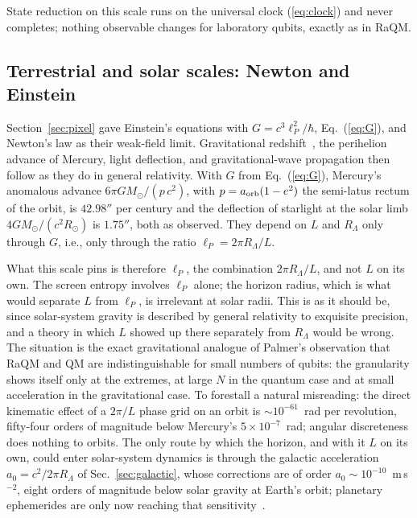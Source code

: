 \documentclass[aps,prd,twocolumn,superscriptaddress,nofootinbib,showkeys]{revtex4-2}
\begin{document}
State reduction on this scale runs on the universal clock (\ref{eq:clock}) and never completes; nothing observable changes for laboratory qubits, exactly as in RaQM.

\subsection{Terrestrial and solar scales: Newton and Einstein}

Section~\ref{sec:pixel} gave Einstein's equations with $G = c^3\ell_P^2/\hbar$, Eq.~(\ref{eq:G}), and Newton's law as their weak-field limit. Gravitational redshift~\cite{pound1960}, the perihelion advance of Mercury, light deflection, and gravitational-wave propagation then follow as they do in general relativity. With $G$ from Eq.~(\ref{eq:G}), Mercury's anomalous advance $6\pi GM_\odot/(p\,c^2)$, with $p = a_{\rm orb}(1-e^2)$ the semi-latus rectum of the orbit, is $42.98''$ per century and the deflection of starlight at the solar limb $4GM_\odot/(c^2R_\odot)$ is $1.75''$, both as observed. They depend on $L$ and $R_\Lambda$ only through $G$, i.e., only through the ratio $\ell_P = 2\pi R_\Lambda/L$.

What this scale pins is therefore $\ell_P$, the combination $2\pi R_\Lambda/L$, and not $L$ on its own. The screen entropy involves $\ell_P$ alone; the horizon radius, which is what would separate $L$ from $\ell_P$, is irrelevant at solar radii. This is as it should be, since solar-system gravity is described by general relativity to exquisite precision, and a theory in which $L$ showed up there separately from $R_\Lambda$ would be wrong. The situation is the exact gravitational analogue of Palmer's observation that RaQM and QM are indistinguishable for small numbers of qubits: the granularity shows itself only at the extremes, at large $N$ in the quantum case and at small acceleration in the gravitational case. To forestall a natural misreading: the direct kinematic effect of a $2\pi/L$ phase grid on an orbit is $\sim10^{-61}$~rad per revolution, fifty-four orders of magnitude below Mercury's $5\times10^{-7}$~rad; angular discreteness does nothing to orbits. The only route by which the horizon, and with it $L$ on its own, could enter solar-system dynamics is through the galactic acceleration $a_0 = c^2/2\pi R_\Lambda$ of Sec.~\ref{sec:galactic}, whose corrections are of order $a_0\sim10^{-10}$~m\,s$^{-2}$, eight orders of magnitude below solar gravity at Earth's orbit; planetary ephemerides are only now reaching that sensitivity~\cite{hees2014}.
\end{document}
